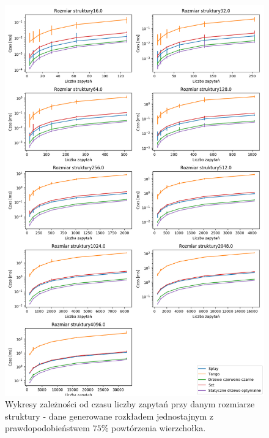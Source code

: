 \documentclass[declaration,shortabstract]{iithesis}
\theoremstyle{thm}
\theoremstyle{remark}
\theoremstyle{plain}
\theoremstyle{plain}
\theoremstyle{plain}
\begin{document}
\begin{figure}[H]  
\centering
    \includegraphics[scale=0.5]{wykresy/uniform25.png}
      \caption{Wykresy zależności od czasu liczby zapytań przy danym rozmiarze struktury - dane generowane rozkładem jednostajnym z prawdopodobieństwem  \(75\%\) powtórzenia wierzchołka. }  
    \label{fig:zigzig} 
\end{figure}
\end{document}
